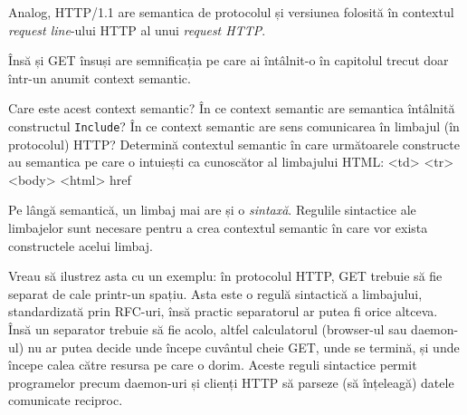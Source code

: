 Analog, {\glqq}HTTP/1.1{\grqq} are semantica de {\glqq}protocolul și versiunea folosită{\grqq}
în contextul \textit{request line}-ului HTTP al unui \textit{request HTTP}.

\begin{Exercise}[title={Întrebări de sinteză},difficulty=2]
Însă și GET însuși are semnificația pe care ai întâlnit-o în capitolul
trecut doar într-un anumit context semantic.

\Question Care este acest context semantic?
\Question În ce context semantic are semantica întâlnită constructul \texttt{Include}?
\Question În ce context semantic are sens comunicarea în limbajul (în protocolul) HTTP?
\ExeText Determină contextul semantic în care următoarele constructe au semantica pe
care o intuiești ca cunoscător al limbajului HTML:
\Question <td>
\Question <tr>
\Question <body>
\Question <html>
\Question href
\end{Exercise}



Pe lângă semantică, un limbaj mai are și o \textsl{sintaxă}. Regulile sintactice
ale limbajelor sunt necesare pentru a crea contextul semantic în
care vor exista constructele acelui limbaj.

Vreau să ilustrez asta cu un exemplu: în protocolul HTTP, GET trebuie
să fie separat de cale printr-un spațiu. Asta este o regulă sintactică
a limbajului, standardizată prin
RFC-uri,
însă practic separatorul ar putea fi orice altceva.
Însă un separator trebuie să fie acolo, altfel calculatorul (browser-ul
sau daemon-ul) nu ar putea decide unde începe cuvântul cheie {\glqq}GET{\grqq}, unde
se termină, și unde începe calea către resursa pe care o dorim.
Aceste reguli sintactice
permit programelor precum daemon-uri și clienți HTTP
să parseze (să {\glqq}înțeleagă{\grqq}) datele comunicate reciproc.

